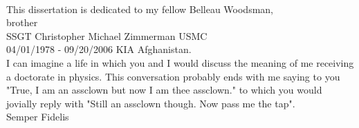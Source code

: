 \begin{center}
\quad \\

\vspace{2in}

\begin{minipage}{0.8\columnwidth}
\begin{center}
{\dedicationfont%
This dissertation is dedicated to my fellow Belleau Woodsman,\\
brother \\ SSGT Christopher Michael Zimmerman USMC \\ 04/01/1978 - 09/20/2006 KIA Afghanistan. \\
I can imagine a life in which you and I would discuss the meaning of me receiving a doctorate in physics. This conversation probably ends with me saying to you "True, I am an assclown but now I am thee assclown." to which you would jovially reply with "Still an assclown though. Now pass me the tap". \\
Semper Fidelis }
\end{center}
\end{minipage}

\end{center}
\clearpage

